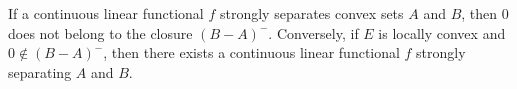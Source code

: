 If a continuous linear functional $f$ strongly separates convex sets $A$ and $B$, then $0$ does not belong to the closure $(B - A)^-$. Conversely, if $E$ is locally convex and $0 \notin (B - A)^-$, then there exists a continuous linear functional $f$ strongly separating $A$ and $B$.
